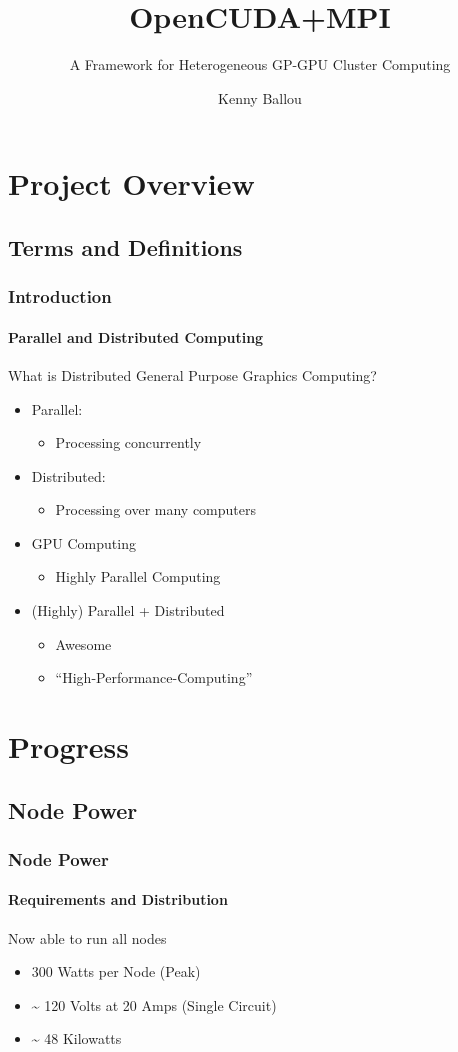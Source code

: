 \documentclass{beamer}
\title{OpenCUDA+MPI}
\subtitle{A Framework for Heterogeneous GP-GPU Cluster Computing}
\author[Ballou]{Kenny Ballou}
\begin{document}
\begin{frame}[label=titleslide]
\titlepage{}
\end{frame}
\begin{frame}
\tableofcontents[subsectionstyle=hide]
\end{frame}
\section{Project Overview}
\subsection{Terms and Definitions}
\begin{frame}
\frametitle{Introduction}
\framesubtitle{Parallel and Distributed Computing}
What is Distributed General Purpose Graphics Computing?
\begin{itemize}
\item{Parallel:}
\begin{itemize}
\item{Processing concurrently}
\end{itemize}
\item{Distributed:}
\begin{itemize}
\item{Processing over many computers}
\end{itemize}
\item{GPU Computing}
\begin{itemize}
\item{Highly Parallel Computing}
\end{itemize}
\item{(Highly) Parallel + Distributed}
\begin{itemize}
\item{Awesome}
\item{``High-Performance-Computing''}
\end{itemize}
\end{itemize}
\end{frame}
\section{Progress}
\subsection{Node Power}
\begin{frame}
\frametitle{Node Power}
\framesubtitle{Requirements and Distribution}
Now able to run all nodes
\begin{itemize}
\item{300 Watts per Node (Peak)}
\item{\~{} 120 Volts at 20 Amps (Single Circuit)}
\item{\~{} 48 Kilowatts}
\end{itemize}
\end{frame}
\end{document}
